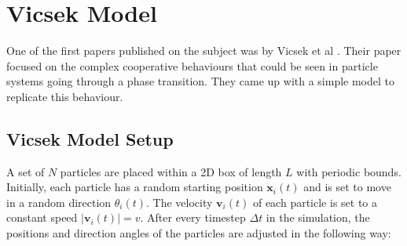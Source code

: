 \documentclass[%
11pt,
amsmath, amssymb,
aps,
pra
]{revtex4-2}
\begin{document}
\section{Vicsek Model}
One of the first papers published on the subject was by Vicsek et al \cite{vicsek1995novel}. Their paper focused on the
complex cooperative behaviours that could be seen in particle systems going through a phase transition. They came up
with a simple model to replicate this behaviour.

\subsection{Vicsek Model Setup}
A set of \(N\) particles are placed within a 2D box of length \(L\) with periodic bounds. Initially, each particle has
a random starting position \(\mathbf{x}_i(t)\) and is set to move in a random direction \(\theta_i(t)\). The velocity \(\mathbf{v}_i(t)\)
of each particle is set to a constant speed \(|\mathbf{v}_i(t)| = v\). After every timestep \(\Delta t\) in the simulation, 
the positions and direction angles of the particles are adjusted in the following way:
\end{document}
